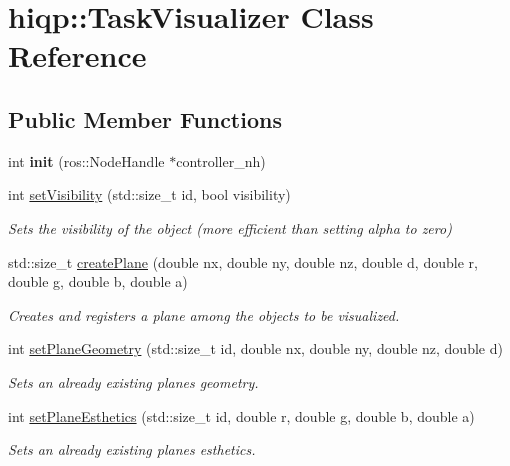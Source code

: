 \hypertarget{classhiqp_1_1TaskVisualizer}{\section{hiqp\-:\-:Task\-Visualizer Class Reference}
\label{classhiqp_1_1TaskVisualizer}
}
\subsection*{Public Member Functions}
\begin{DoxyCompactItemize}
\item 
\hypertarget{classhiqp_1_1TaskVisualizer_adbbab9f82514fe7ccd96e5c6e16be780}{int {\bfseries init} (ros\-::\-Node\-Handle $\ast$controller\-\_\-nh)}\label{classhiqp_1_1TaskVisualizer_adbbab9f82514fe7ccd96e5c6e16be780}

\item 
int \hyperlink{classhiqp_1_1TaskVisualizer_ac591685c77aa46472120dad1483cb7e1}{set\-Visibility} (std\-::size\-\_\-t id, bool visibility)
\begin{DoxyCompactList}\small\item\em Sets the visibility of the object (more efficient than setting alpha to zero) \end{DoxyCompactList}\item 
std\-::size\-\_\-t \hyperlink{classhiqp_1_1TaskVisualizer_a538bfbc2c33a5ed03feaedfc1ae06fac}{create\-Plane} (double nx, double ny, double nz, double d, double r, double g, double b, double a)
\begin{DoxyCompactList}\small\item\em Creates and registers a plane among the objects to be visualized. \end{DoxyCompactList}\item 
int \hyperlink{classhiqp_1_1TaskVisualizer_acac4eca22d5adadac5857327d06d9b5a}{set\-Plane\-Geometry} (std\-::size\-\_\-t id, double nx, double ny, double nz, double d)
\begin{DoxyCompactList}\small\item\em Sets an already existing planes geometry. \end{DoxyCompactList}\item 
int \hyperlink{classhiqp_1_1TaskVisualizer_a9615b534b49aa9d9cf0c2d91cd10ba0e}{set\-Plane\-Esthetics} (std\-::size\-\_\-t id, double r, double g, double b, double a)
\begin{DoxyCompactList}\small\item\em Sets an already existing planes esthetics. \end{DoxyCompactList}\end{DoxyCompactItemize}


